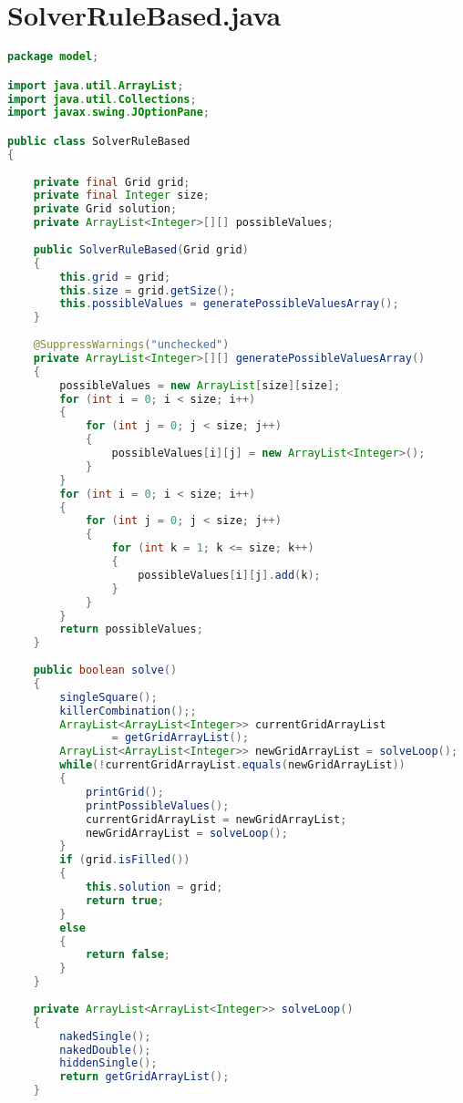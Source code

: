 \section{SolverRuleBased.java}
\label{sec:kodeprogramrb}

\begin{lstlisting}[language=Java,basicstyle=\tiny,caption=SolverRuleBased.java]
package model;

import java.util.ArrayList;
import java.util.Collections;
import javax.swing.JOptionPane;

public class SolverRuleBased
{
    
    private final Grid grid;
    private final Integer size;
    private Grid solution;
    private ArrayList<Integer>[][] possibleValues;
    
    public SolverRuleBased(Grid grid)
    {
        this.grid = grid;
        this.size = grid.getSize();
        this.possibleValues = generatePossibleValuesArray();
    }
    
    @SuppressWarnings("unchecked")
	private ArrayList<Integer>[][] generatePossibleValuesArray()
    {
        possibleValues = new ArrayList[size][size];
        for (int i = 0; i < size; i++)
        {
            for (int j = 0; j < size; j++)
            {
                possibleValues[i][j] = new ArrayList<Integer>();
            }
        }
        for (int i = 0; i < size; i++)
        {
            for (int j = 0; j < size; j++)
            {
                for (int k = 1; k <= size; k++)
                {
                    possibleValues[i][j].add(k);
                }
            }
        }
        return possibleValues;
    }
    
    public boolean solve()
    {
        singleSquare();
        killerCombination();;
        ArrayList<ArrayList<Integer>> currentGridArrayList 
                = getGridArrayList();
        ArrayList<ArrayList<Integer>> newGridArrayList = solveLoop();
        while(!currentGridArrayList.equals(newGridArrayList))
        {
            printGrid();
            printPossibleValues();
            currentGridArrayList = newGridArrayList;
            newGridArrayList = solveLoop();
        }
        if (grid.isFilled())
        {
            this.solution = grid;
            return true;
        }
        else
        {
            return false;
        }
    }
    
    private ArrayList<ArrayList<Integer>> solveLoop()
    {
        nakedSingle();
        nakedDouble();
        hiddenSingle();
        return getGridArrayList();
    }
    

\end{lstlisting}

